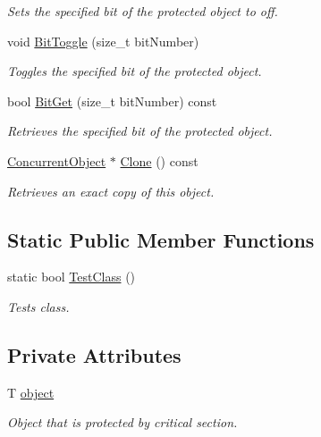 \begin{DoxyCompactItemize}
\begin{DoxyCompactList}\small\item\em Sets the specified bit of the protected object to off. \item\end{DoxyCompactList}\item 
void \hyperlink{class_concurrent_object_a2d4cb6575506a160c4f86d98d1c5e0a7}{BitToggle} (size\_\-t bitNumber)
\begin{DoxyCompactList}\small\item\em Toggles the specified bit of the protected object. \item\end{DoxyCompactList}\item 
bool \hyperlink{class_concurrent_object_a06cf9224d2a23979055560bf12c02c7f}{BitGet} (size\_\-t bitNumber) const 
\begin{DoxyCompactList}\small\item\em Retrieves the specified bit of the protected object. \item\end{DoxyCompactList}\item 
\hyperlink{class_concurrent_object}{ConcurrentObject} $\ast$ \hyperlink{class_concurrent_object_a9890ec2fff5e177bf3575d11d6a164f5}{Clone} () const 
\begin{DoxyCompactList}\small\item\em Retrieves an exact copy of this object. \item\end{DoxyCompactList}\end{DoxyCompactItemize}
\subsection*{Static Public Member Functions}
\begin{DoxyCompactItemize}
\item 
static bool \hyperlink{class_concurrent_object_accf05dbac146e8d6a87d1efa541eac42}{TestClass} ()
\begin{DoxyCompactList}\small\item\em Tests class. \item\end{DoxyCompactList}\end{DoxyCompactItemize}
\subsection*{Private Attributes}
\begin{DoxyCompactItemize}
\item 
\hypertarget{class_concurrent_object_a4ad66e44437b84b0ec7fd9d479a8300f}{
T \hyperlink{class_concurrent_object_a4ad66e44437b84b0ec7fd9d479a8300f}{object}}
\label{class_concurrent_object_a4ad66e44437b84b0ec7fd9d479a8300f}

\begin{DoxyCompactList}\small\item\em Object that is protected by critical section. \item\end{DoxyCompactList}\end{DoxyCompactItemize}


